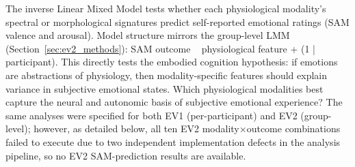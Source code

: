 The inverse Linear Mixed Model tests whether each physiological modality's spectral or morphological signatures predict self-reported emotional ratings (SAM valence and arousal). Model structure mirrors the group-level LMM (Section~\ref{sec:ev2_methods}): SAM outcome ~ physiological feature + (1 | participant). This directly tests the embodied cognition hypothesis: if emotions are abstractions of physiology, then modality-specific features should explain variance in subjective emotional states. Which physiological modalities best capture the neural and autonomic basis of subjective emotional experience? The same analyses were specified for both EV1 (per-participant) and EV2 (group-level); however, as detailed below, all ten EV2 modality$\times$outcome combinations failed to execute due to two independent implementation defects in the analysis pipeline, so no EV2 SAM-prediction results are available.

